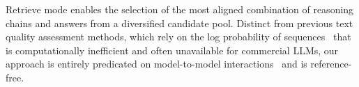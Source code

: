 Retrieve mode enables the selection of the most aligned combination of reasoning chains and answers from a diversified candidate pool.
Distinct from previous text quality assessment methods, 
which rely on the log probability of sequences~\citep{adiwardana2020towards} that is computationally inefficient and often unavailable for commercial LLMs,
our approach is entirely predicated on model-to-model interactions~\citep{chen2023exploring} and is reference-free.